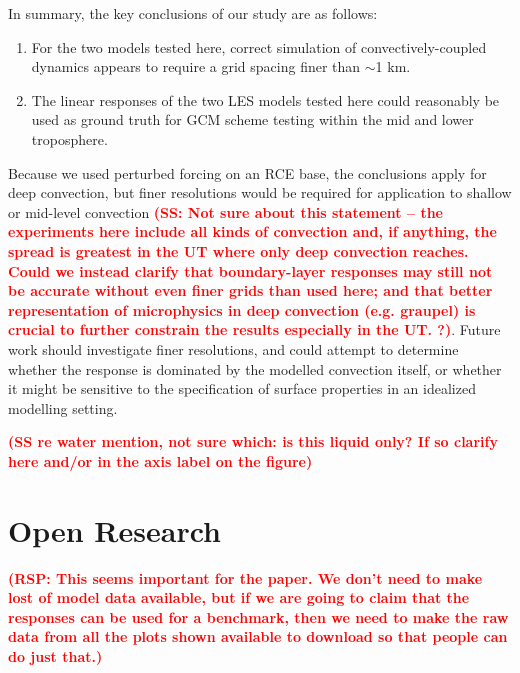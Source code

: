 \documentclass[draft]{agujournal2019}
\newcommand{\todo}[1]{\textcolor{red}{\textbf{(#1)}}}
\begin{document}
In summary, the key conclusions of our study are as follows:

\begin{enumerate}
    \item For the two models tested here, correct simulation of convectively-coupled dynamics
    appears to require a grid spacing finer than $\sim$1 km.
    \item The linear responses of the two LES models tested here could
    reasonably be used as ground truth for GCM scheme testing within the mid and lower troposphere.
\end{enumerate}

Because we used perturbed forcing on an RCE base, the conclusions apply for deep
convection, but finer resolutions would be required for application to shallow
or mid-level convection \todo{SS: Not sure about this statement -- the experiments here include all kinds of convection and, if anything, the spread is greatest in the UT where only deep convection reaches.  Could we instead clarify that boundary-layer responses may still not be accurate without even finer grids than used here; and that better representation of microphysics in deep convection (e.g. graupel) is crucial to further constrain the results especially in the UT. ?}. Future work should investigate finer resolutions, and
could attempt to determine whether the response is dominated by the modelled
convection itself, or whether it might be sensitive to the specification of
surface properties in an idealized modelling setting.

\todo{SS re water mention, not sure which: is this liquid only?  If so clarify here and/or in the axis label on the figure}

\section{Open Research}

\todo{RSP: This seems important for the paper. We don't need to make lost of model data available, but if we are going to claim that the responses can be used for a benchmark, then we need to make the raw data from all the plots shown available to download so that people can do just that.}


\end{document}
